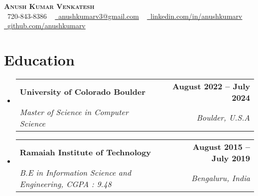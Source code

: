 \documentclass[letterpaper,11pt]{article}
\makeatletter
\newcommand{\resumeSubheading}[4]{
  \vspace{-2pt}\item
    \begin{tabular*}{1.0\textwidth}[t]{l@{\extracolsep{\fill}}r}
      \textbf{#1} & \textbf{\small #2} \\
      \textit{\small#3} & \textit{\small #4} \\
    \end{tabular*}\vspace{-7pt}
}
\newcommand{\resumeSubHeadingListStart}{\begin{itemize}[leftmargin=0.0in, label={}]}
\newcommand{\resumeSubHeadingListEnd}{\end{itemize}}
\makeatother
\begin{document}

\begin{center}
    {\Huge \scshape \textbf{Anush Kumar Venkatesh}} \\ \vspace{1pt}
    \small \raisebox{-0.1\height}\faPhone\ 720-843-8386 ~ \href{mailto:x@gmail.com}{\raisebox{-0.2\height}\faEnvelope\  \underline{anushkumarv3@gmail.com}} ~ 
    \href{https://linkedin.com/in//}{\raisebox{-0.2\height}\faLinkedin\ \underline{linkedin.com/in/anushkumarv}}  ~
    \href{https://github.com/}{\raisebox{-0.2\height}\faGithub\ \underline{github.com/anushkumarv}}
    \vspace{-8pt}
\end{center}

\section{Education}
  \resumeSubHeadingListStart
    \resumeSubheading
      {University of Colorado Boulder}{August 2022 -- July 2024}
      {Master of Science in Computer Science}{Boulder, U.S.A}
    \resumeSubheading
      {Ramaiah Institute of Technology}{August 2015 -- July 2019}
      {B.E in Information Science and Engineering, CGPA : 9.48}{Bengaluru, India}
  \resumeSubHeadingListEnd
\end{document}
